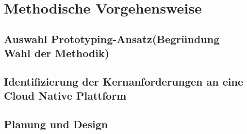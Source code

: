 \newpage
\section{Methodische Vorgehensweise}\label{lab:methodische_vorgehensweise}
\subsection{Auswahl Prototyping-Ansatz(Begründung Wahl der Methodik)}
\subsection{Identifizierung der Kernanforderungen an eine Cloud Native Plattform}
\subsection{Planung und Design}